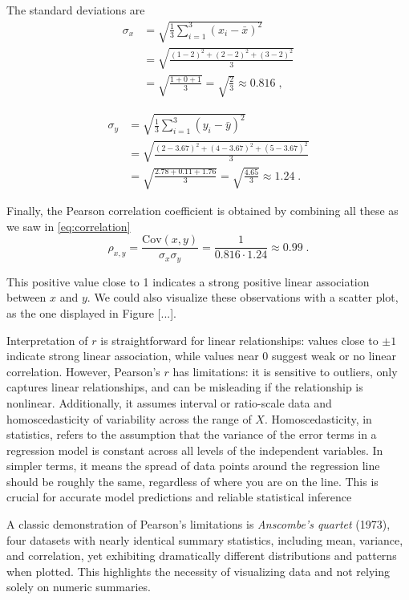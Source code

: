\documentclass{book}
\begin{document}
The standard deviations are  
\begin{align}
	\sigma_x 
	&= \sqrt{\frac{1}{3} \sum_{i=1}^3 (x_i - \bar{x})^2} \nonumber \\[1mm]
	&= \sqrt{\frac{(1-2)^2 + (2-2)^2 + (3-2)^2}{3}} \nonumber \\[1mm]
	&= \sqrt{\frac{1 + 0 + 1}{3}} = \sqrt{\frac{2}{3}} \approx 0.816 \; , \nonumber
\end{align}

\begin{align}
	\sigma_y 
	&= \sqrt{\frac{1}{3} \sum_{i=1}^3 (y_i - \bar{y})^2} \nonumber \\[1mm]
	&= \sqrt{\frac{(2-3.67)^2 + (4-3.67)^2 + (5-3.67)^2}{3}} \nonumber \\[1mm]
	&= \sqrt{\frac{2.78 + 0.11 + 1.76}{3}} = \sqrt{\frac{4.65}{3}} \approx 1.24 \; . \nonumber
\end{align}


Finally, the Pearson correlation coefficient is obtained by combining all these as we saw in \eqref{eq:correlation}
\begin{equation}
	\rho_{x, y} = \frac{\mathrm{Cov}(x, y)}{\sigma_x \sigma_y}  = \frac{1}{0.816 \cdot 1.24} \approx 0.99 \; .
\end{equation}

This positive value close to 1 indicates a strong positive linear association between $x$ and $y$. We could also visualize these observations with a scatter plot, as the one displayed in Figure [...].

\medskip

Interpretation of $r$ is straightforward for linear relationships: values close to $\pm 1$ indicate strong linear association, while values near $0$ suggest weak or no linear correlation. However, Pearson's $r$ has limitations: it is sensitive to outliers, only captures linear relationships, and can be misleading if the relationship is nonlinear. Additionally, it assumes interval or ratio-scale data and homoscedasticity of variability across the range of $X$. Homoscedasticity, in statistics, refers to the assumption that the variance of the error terms in a regression model is constant across all levels of the independent variables. In simpler terms, it means the spread of data points around the regression line should be roughly the same, regardless of where you are on the line. This is crucial for accurate model predictions and reliable statistical inference

\medskip

A classic demonstration of Pearson's limitations is \textit{Anscombe's quartet} (1973), four datasets with nearly identical summary statistics, including mean, variance, and correlation, yet exhibiting dramatically different distributions and patterns when plotted. This highlights the necessity of visualizing data and not relying solely on numeric summaries.
\end{document}
